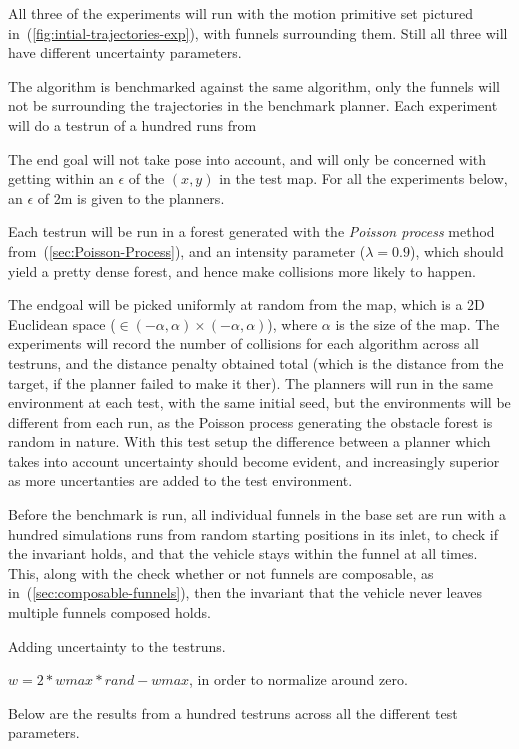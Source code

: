 All three of the experiments will run with the motion primitive set pictured
in~(\ref{fig:intial-trajectories-exp}), with funnels surrounding them. Still all
three will have different uncertainty parameters.

The \rrtfunnel{} algorithm is benchmarked against the same algorithm, only the
funnels will not be surrounding the trajectories in the benchmark planner. Each
experiment will do a testrun of a hundred runs from

The end goal will not take pose into account, and will only be concerned with
getting within an \(\epsilon\) of the \((x,y)\) in the test map. For all the
experiments below, an \(\epsilon\) of 2\si{\metre} is given to the planners.

Each testrun will be run in a forest generated with the \textit{Poisson process}
method from~(\ref{sec:Poisson-Process}), and an intensity parameter (\(\lambda =
0.9\)), which should yield a pretty dense forest, and hence make collisions more
likely to happen.

The endgoal will be picked uniformly at random from the map, which is a 2D
Euclidean space (\ie \(\in (-\alpha,\alpha)\times(-\alpha,\alpha)\)), where
\(\alpha\) is the size of the map. The experiments will record the number of
collisions for each algorithm across all testruns, and the distance penalty
obtained total (which is the distance from the target, if the planner failed to
make it ther). The planners will run in the same environment at each test, with
the same initial seed, but the environments will be different from each run, as
the Poisson process generating the obstacle forest is random in nature. With
this test setup the difference between a planner which takes into account
uncertainty should become evident, and increasingly superior as more
uncertanties are added to the test environment.

Before the benchmark is run, all individual funnels in the base set are run with
a hundred simulations runs from random starting positions in its inlet, to check
if the invariant holds, and that the vehicle stays within the funnel at all
times. This, along with the check whether or not funnels are composable, as
in~(\ref{sec:composable-funnels}), then the invariant that the vehicle never leaves
multiple funnels composed holds.

Adding uncertainty to the testruns.

\(w = 2*wmax*rand - wmax\), in order to normalize around zero.

Below are the results from a hundred testruns across all the different test
parameters.


